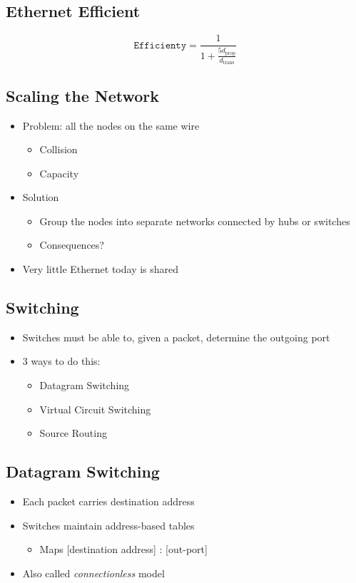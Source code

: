 \subsection{Ethernet Efficient}
\[\texttt{Efficienty}  = \frac{1}{1+\frac{5d_{\text{prop}}}{d_{\text{trans}}}}\]

\subsection{Scaling the Network}
\begin{itemize}[nosep]
    \item Problem: all the nodes on the same wire
          \begin{itemize}[nosep]
              \item Collision
              \item Capacity
          \end{itemize}
    \item Solution
          \begin{itemize}[nosep]
              \item Group the nodes into separate networks connected by hubs or switches
              \item Consequences?
          \end{itemize}
    \item Very little Ethernet today is shared
\end{itemize}

\subsection{Switching}
\begin{itemize}[nosep]
    \item Switches must be able to, given a packet, determine the outgoing port
    \item 3 ways to do this:
          \begin{itemize}[nosep]
              \item Datagram Switching
              \item Virtual Circuit Switching
              \item Source Routing
          \end{itemize}
\end{itemize}

\subsection{Datagram Switching}
\begin{itemize}[nosep]
    \item Each packet carries destination address
    \item Switches maintain address-based tables
          \begin{itemize}[nosep]
              \item Maps [destination address] : [out-port]
          \end{itemize}
    \item Also called \emph{connectionless} model
\end{itemize}

